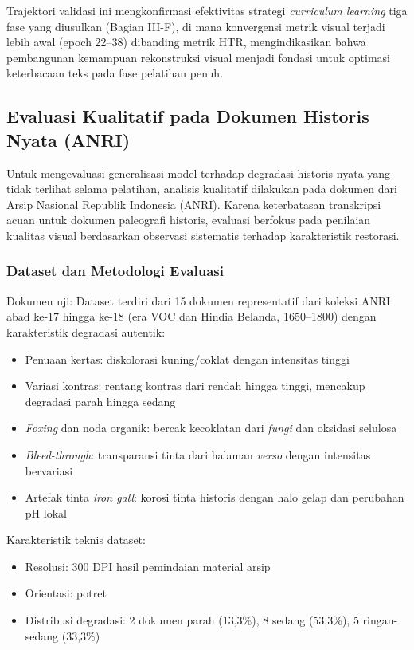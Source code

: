 \documentclass[journal]{IEEEtran}
\begin{document}
Trajektori validasi ini mengkonfirmasi efektivitas strategi \textit{curriculum learning} tiga fase yang diusulkan (Bagian III-F), di mana konvergensi metrik visual terjadi lebih awal (epoch 22--38) dibanding metrik HTR, mengindikasikan bahwa pembangunan kemampuan rekonstruksi visual menjadi fondasi untuk optimasi keterbacaan teks pada fase pelatihan penuh.

\subsection{Evaluasi Kualitatif pada Dokumen Historis Nyata (ANRI)}

Untuk mengevaluasi generalisasi model terhadap degradasi historis nyata yang tidak terlihat selama pelatihan, analisis kualitatif dilakukan pada dokumen dari Arsip Nasional Republik Indonesia (ANRI). Karena keterbatasan transkripsi acuan untuk dokumen paleografi historis, evaluasi berfokus pada penilaian kualitas visual berdasarkan observasi sistematis terhadap karakteristik restorasi.

\subsubsection{Dataset dan Metodologi Evaluasi}

Dokumen uji: Dataset terdiri dari 15 dokumen representatif dari koleksi ANRI abad ke-17 hingga ke-18 (era VOC dan Hindia Belanda, 1650--1800) dengan karakteristik degradasi autentik:
\begin{itemize}
    \item Penuaan kertas: diskolorasi kuning/coklat dengan intensitas tinggi
    \item Variasi kontras: rentang kontras dari rendah hingga tinggi, mencakup degradasi parah hingga sedang
    \item \textit{Foxing} dan noda organik: bercak kecoklatan dari \textit{fungi} dan oksidasi selulosa
    \item \textit{Bleed-through}: transparansi tinta dari halaman \textit{verso} dengan intensitas bervariasi
    \item Artefak tinta \textit{iron gall}: korosi tinta historis dengan halo gelap dan perubahan pH lokal
\end{itemize}

Karakteristik teknis dataset:
\begin{itemize}
    \item Resolusi: 300 DPI hasil pemindaian material arsip
    \item Orientasi: potret
    \item Distribusi degradasi: 2 dokumen parah (13,3\%), 8 sedang (53,3\%), 5 ringan-sedang (33,3\%)
\end{itemize}
\end{document}
